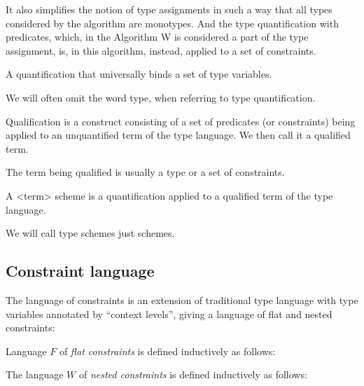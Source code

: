 It also simplifies the notion of type assignments in such a way that all types considered by the algorithm are monotypes. And the type quantification with predicates, which, in the Algorithm W is considered a part of the type assignment, is, in this algorithm, instead, applied to a set of constraints.

\begin{defn}
    A quantification that universally binds a set of type variables.

    We will often omit the word type, when referring to type quantification.
\end{defn}

\begin{defn}[Qualification]
    Qualification is a construct consisting of a set of predicates (or constraints) being applied to an unquantified term of the type language. We then call it a qualified term.

    The term being qualified is usually a type or a set of constraints.
\end{defn}

\begin{defn}[Scheme]
    A <term> scheme is a quantification applied to a qualified term of the type language.

    We will call type schemes just schemes.
\end{defn}

\subsection{Constraint language}

The language of constraints is an extension of traditional type language with type variables annotated by ``context levels'', giving a language of flat and nested constraints:
\begin{defn}
  Language $F$ of \emph{flat constraints} is defined inductively as follows:

    \begin{center}\begin{grammar}
    \end{grammar}\end{center}

  The language $W$ of \emph{nested constraints} is defined inductively as follows:

    \begin{center}\begin{grammar}
    \end{grammar}\end{center}

    \label{constraint_language}
\end{defn}

